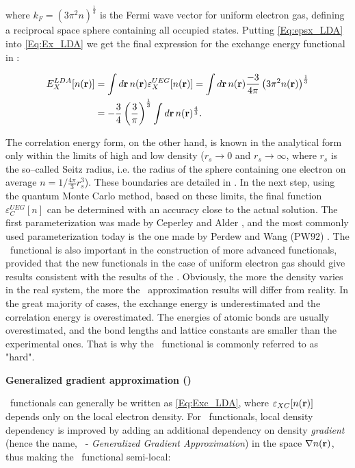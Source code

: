 where $k_F=\left(3\pi^2n\right)^\frac{1}{3}$ is the Fermi wave vector for uniform electron gas, defining a reciprocal space sphere containing all occupied states.
Putting \ref{Eq:epsx_LDA} into \ref{Eq:Ex_LDA} we get the final expression for the exchange energy functional in \LDA:

\begin{equation}
    \label{Eq:Ex_LDA_final} 
    \begin{aligned}
        E_{X}^{LDA}[n(\mathbf{r})]&=\int d\mathbf{r}\, n(\mathbf{r})\varepsilon_{X}^{UEG}[n(\mathbf{r})]=\int d\mathbf{r}\, n(\mathbf{r})\frac{-3}{4\pi}\left(3\pi^2n(\mathbf{r})\right)^\frac{1}{3}\\
        &=-\frac{3}{4}\left(\frac{3}{\pi}\right)^\frac{1}{3}\int d\mathbf{r}\,n(\mathbf{r})^\frac{4}{3}.
    \end{aligned}
\end{equation}

The correlation energy form, on the other hand, is known in the analytical form only within the limits of high and low density ($r_s \rightarrow 0$ and $r_s \rightarrow \infty$, where $r_s$ is the so--called Seitz radius, i.e. the radius of the sphere containing one electron on average $n=1/\frac{4\pi}{3}r_s^3$).
These boundaries are detailed in \cite{lda_highlow}.
In the next step, using the quantum Monte Carlo method, based on these limits, the final function $\varepsilon_C^{UEG}[n]$ can be determined with an accuracy close to the actual solution.
The first parameterization was made by Ceperley and Alder \cite{ceperley}, and the most commonly used parameterization today is the one made by Perdew and Wang (PW$92$) \cite{perdew_wang}.
The \LDA\ functional is also important in the construction of more advanced functionals, provided that the new functionals in the case of uniform electron gas should give results consistent with the results of the \LDA.
Obviously, the more the density varies in the real system, the more the \LDA\ approximation results will differ from reality.
In the great majority of cases, the exchange energy is underestimated and the correlation energy is overestimated.
The energies of atomic bonds are usually overestimated, and the bond lengths and lattice constants are smaller than the experimental ones.
That is why the \LDA\ functional is commonly referred to as "hard".

\textbf{Generalized gradient approximation (\GGA)}

\LDA\ functionals can generally be written as \ref{Eq:Exc_LDA}, where $\varepsilon_{XC}[n(\mathbf{r})]$ depends only on the local electron density.
For \GGA\ functionals, local density dependency is improved by adding an additional dependency on density \emph{gradient} (hence the name, \GGA\ - \emph{Generalized Gradient Approximation}) in the space $\nabla n(\mathbf{r})$, thus making the \GGA\ functional semi-local:

